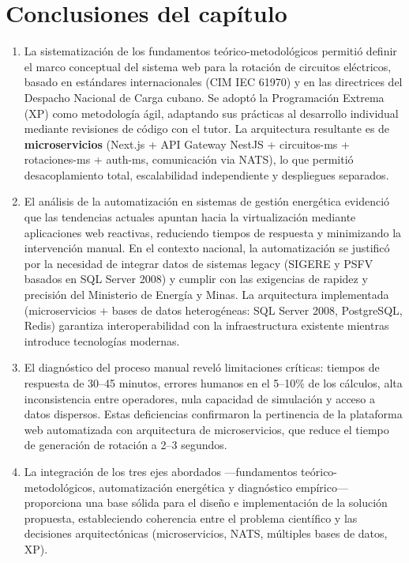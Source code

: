 \section{Conclusiones del capítulo}

\begin{enumerate}
    \item La sistematización de los fundamentos teórico-metodológicos permitió definir el marco conceptual del sistema web para la rotación de circuitos eléctricos, basado en estándares internacionales (CIM IEC 61970) y en las directrices del Despacho Nacional de Carga cubano. Se adoptó la Programación Extrema (XP) como metodología ágil, adaptando sus prácticas al desarrollo individual mediante revisiones de código con el tutor. La arquitectura resultante es de \textbf{microservicios} (Next.js + API Gateway NestJS + circuitos-ms + rotaciones-ms + auth-ms, comunicación via NATS), lo que permitió desacoplamiento total, escalabilidad independiente y despliegues separados.
    
    \item El análisis de la automatización en sistemas de gestión energética evidenció que las tendencias actuales apuntan hacia la virtualización mediante aplicaciones web reactivas, reduciendo tiempos de respuesta y minimizando la intervención manual. En el contexto nacional, la automatización se justificó por la necesidad de integrar datos de sistemas legacy (SIGERE y PSFV basados en SQL Server 2008) y cumplir con las exigencias de rapidez y precisión del Ministerio de Energía y Minas. La arquitectura implementada (microservicios + bases de datos heterogéneas: SQL Server 2008, PostgreSQL, Redis) garantiza interoperabilidad con la infraestructura existente mientras introduce tecnologías modernas.
    
    \item El diagnóstico del proceso manual reveló limitaciones críticas: tiempos de respuesta de 30–45 minutos, errores humanos en el 5–10\% de los cálculos, alta inconsistencia entre operadores, nula capacidad de simulación y acceso a datos dispersos. Estas deficiencias confirmaron la pertinencia de la plataforma web automatizada con arquitectura de microservicios, que reduce el tiempo de generación de rotación a 2--3 segundos.
    
    \item La integración de los tres ejes abordados —fundamentos teórico-metodológicos, automatización energética y diagnóstico empírico— proporciona una base sólida para el diseño e implementación de la solución propuesta, estableciendo coherencia entre el problema científico y las decisiones arquitectónicas (microservicios, NATS, múltiples bases de datos, XP).
\end{enumerate}